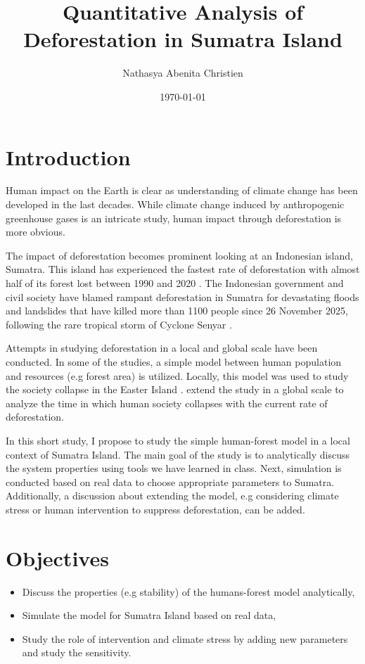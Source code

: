 \documentclass[12pt,a4paper]{article}
\title{Quantitative Analysis of Deforestation in Sumatra Island}
\author{Nathasya Abenita Christien}
\date{\today}
\begin{document}
\maketitle


\section{Introduction}
Human impact on the Earth is clear as understanding of climate change has been developed in the last decades. While climate change induced by anthropogenic greenhouse gases is an intricate study, human impact through deforestation is more obvious. 

The impact of deforestation becomes prominent looking at an Indonesian island, Sumatra. This island has experienced the fastest rate of deforestation with almost half of its forest lost between 1990 and 2020 \citep{pnas}. The Indonesian government and civil society have blamed rampant deforestation in Sumatra for devastating floods and landslides that have killed more than 1100 people since 26 November 2025, following the rare tropical storm of Cyclone Senyar \citep{earthsight}.

Attempts in studying deforestation in a local and global scale have been conducted. In some of the studies, a simple model between human population and resources (e.g forest area) is utilized. Locally, this model was used to study the society collapse in the Easter Island \citep{bologna2008simple}. \cite{bologna2020deforestation} extend the study in a global scale to analyze the time in which human society collapses with the current rate of deforestation.

In this short study, I propose to study the simple human-forest model in a local context of Sumatra Island. The main goal of the study is to analytically discuss the system properties using tools we have learned in class. Next, simulation is conducted based on real data to choose appropriate parameters to Sumatra. Additionally, a discussion about extending the model, e.g considering climate stress or human intervention to suppress deforestation, can be added.

\section{Objectives}
\begin{itemize}
    \item Discuss the properties (e.g stability) of the humans-forest model analytically,
    \item Simulate the model for Sumatra Island based on real data,
    \item Study the role of intervention and climate stress by adding new parameters and study the sensitivity.
\end{itemize}
\end{document}
